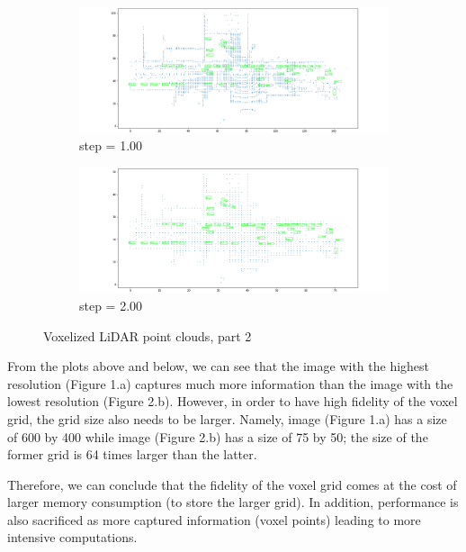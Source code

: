 \documentclass[letter]{article}
\begin{document}
	\begin{figure}[h]
		\begin{subfigure}[t]{\textwidth}
			\centering
			\includegraphics[width=\linewidth]{images/vox000_step1-00.png}
			\caption{step = 1.00}
		\end{subfigure}
		\vspace*{1mm}
	  
		\begin{subfigure}[t]{\textwidth}
			\centering
			\includegraphics[width=\linewidth]{images/vox000_step2-00.png}
			\caption{step = 2.00}
		\end{subfigure}

		\caption{Voxelized LiDAR point clouds, part 2}
	\end{figure}

	From the plots above and below, we can see that the image with the highest resolution (Figure 1.a) captures much more information than the image with the lowest resolution (Figure 2.b). However, in order to have high fidelity of the voxel grid, the grid size also needs to be larger. Namely, image (Figure 1.a) has a size of 600 by 400 while image (Figure 2.b) has a size of 75 by 50; the size of the former grid is 64 times larger than the latter. 

	Therefore, we can conclude that the fidelity of the voxel grid comes at the cost of larger memory consumption (to store the larger grid). In addition, performance is also sacrificed as more captured information (voxel points) leading to more intensive computations. 
\end{document}
